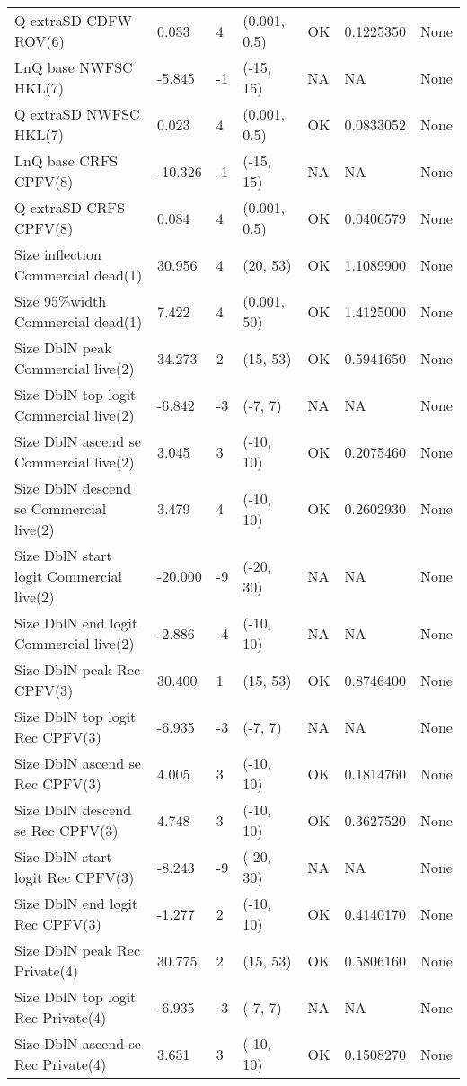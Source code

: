 \documentclass[11pt,
  english,
  letterpaper,
]{article}
\begin{document}
\begin{landscape}
\begin{longtable}[t]{>{\raggedright\arraybackslash}p{7cm}lllll>{\raggedright\arraybackslash}p{4cm}}
Q extraSD CDFW ROV(6) & 0.033 & 4 & (0.001, 0.5) & OK & 0.1225350 & None\\
LnQ base NWFSC HKL(7) & -5.845 & -1 & (-15, 15) & NA & NA & None\\
Q extraSD NWFSC HKL(7) & 0.023 & 4 & (0.001, 0.5) & OK & 0.0833052 & None\\
LnQ base CRFS CPFV(8) & -10.326 & -1 & (-15, 15) & NA & NA & None\\
Q extraSD CRFS CPFV(8) & 0.084 & 4 & (0.001, 0.5) & OK & 0.0406579 & None\\
Size inflection Commercial dead(1) & 30.956 & 4 & (20, 53) & OK & 1.1089900 & None\\
Size 95\%width Commercial dead(1) & 7.422 & 4 & (0.001, 50) & OK & 1.4125000 & None\\
Size DblN peak Commercial live(2) & 34.273 & 2 & (15, 53) & OK & 0.5941650 & None\\
Size DblN top logit Commercial live(2) & -6.842 & -3 & (-7, 7) & NA & NA & None\\
Size DblN ascend se Commercial live(2) & 3.045 & 3 & (-10, 10) & OK & 0.2075460 & None\\
Size DblN descend se Commercial live(2) & 3.479 & 4 & (-10, 10) & OK & 0.2602930 & None\\
Size DblN start logit Commercial live(2) & -20.000 & -9 & (-20, 30) & NA & NA & None\\
Size DblN end logit Commercial live(2) & -2.886 & -4 & (-10, 10) & NA & NA & None\\
Size DblN peak Rec CPFV(3) & 30.400 & 1 & (15, 53) & OK & 0.8746400 & None\\
Size DblN top logit Rec CPFV(3) & -6.935 & -3 & (-7, 7) & NA & NA & None\\
Size DblN ascend se Rec CPFV(3) & 4.005 & 3 & (-10, 10) & OK & 0.1814760 & None\\
Size DblN descend se Rec CPFV(3) & 4.748 & 3 & (-10, 10) & OK & 0.3627520 & None\\
Size DblN start logit Rec CPFV(3) & -8.243 & -9 & (-20, 30) & NA & NA & None\\
Size DblN end logit Rec CPFV(3) & -1.277 & 2 & (-10, 10) & OK & 0.4140170 & None\\
Size DblN peak Rec Private(4) & 30.775 & 2 & (15, 53) & OK & 0.5806160 & None\\
Size DblN top logit Rec Private(4) & -6.935 & -3 & (-7, 7) & NA & NA & None\\
Size DblN ascend se Rec Private(4) & 3.631 & 3 & (-10, 10) & OK & 0.1508270 & None\\

\end{longtable}
\end{landscape}
\end{document}
